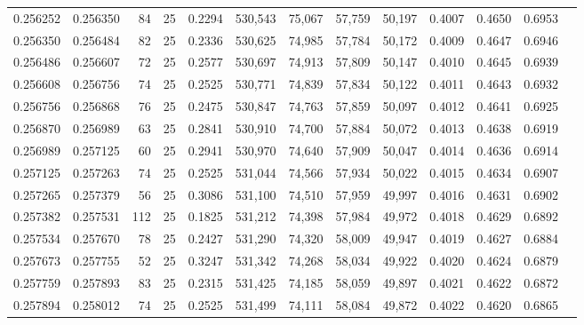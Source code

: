 \begin{tabular}{rrrrrrrrrrrrr}
0.256252 & 0.256350 &    84 &  25 &                                     0.2294 & 530,543 &  75,067 &  57,759 &  50,197 & 0.4007 & 0.4650 & 0.6953 \\
0.256350 & 0.256484 &    82 &  25 &                                     0.2336 & 530,625 &  74,985 &  57,784 &  50,172 & 0.4009 & 0.4647 & 0.6946 \\
0.256486 & 0.256607 &    72 &  25 &                                     0.2577 & 530,697 &  74,913 &  57,809 &  50,147 & 0.4010 & 0.4645 & 0.6939 \\
0.256608 & 0.256756 &    74 &  25 &                                     0.2525 & 530,771 &  74,839 &  57,834 &  50,122 & 0.4011 & 0.4643 & 0.6932 \\
0.256756 & 0.256868 &    76 &  25 &                                     0.2475 & 530,847 &  74,763 &  57,859 &  50,097 & 0.4012 & 0.4641 & 0.6925 \\
0.256870 & 0.256989 &    63 &  25 &                                     0.2841 & 530,910 &  74,700 &  57,884 &  50,072 & 0.4013 & 0.4638 & 0.6919 \\
0.256989 & 0.257125 &    60 &  25 &                                     0.2941 & 530,970 &  74,640 &  57,909 &  50,047 & 0.4014 & 0.4636 & 0.6914 \\
0.257125 & 0.257263 &    74 &  25 &                                     0.2525 & 531,044 &  74,566 &  57,934 &  50,022 & 0.4015 & 0.4634 & 0.6907 \\
0.257265 & 0.257379 &    56 &  25 &                                     0.3086 & 531,100 &  74,510 &  57,959 &  49,997 & 0.4016 & 0.4631 & 0.6902 \\
0.257382 & 0.257531 &   112 &  25 &                                     0.1825 & 531,212 &  74,398 &  57,984 &  49,972 & 0.4018 & 0.4629 & 0.6892 \\
0.257534 & 0.257670 &    78 &  25 &                                     0.2427 & 531,290 &  74,320 &  58,009 &  49,947 & 0.4019 & 0.4627 & 0.6884 \\
0.257673 & 0.257755 &    52 &  25 &                                     0.3247 & 531,342 &  74,268 &  58,034 &  49,922 & 0.4020 & 0.4624 & 0.6879 \\
0.257759 & 0.257893 &    83 &  25 &                                     0.2315 & 531,425 &  74,185 &  58,059 &  49,897 & 0.4021 & 0.4622 & 0.6872 \\
0.257894 & 0.258012 &    74 &  25 &                                     0.2525 & 531,499 &  74,111 &  58,084 &  49,872 & 0.4022 & 0.4620 & 0.6865 \\

\end{tabular}
